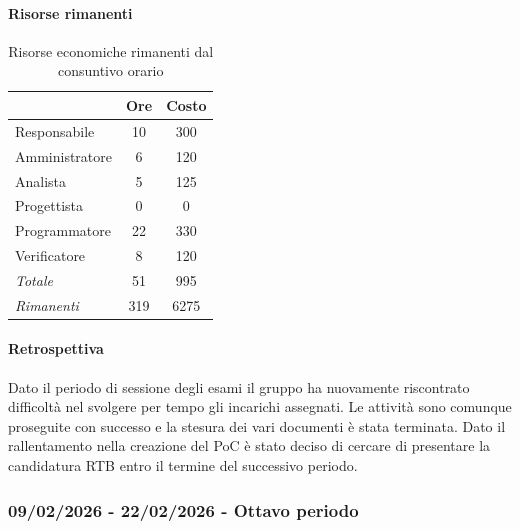 \documentclass[a4paper,12pt]{article}
\begin{document}
            \paragraph{Risorse rimanenti}
                \begin{table}[H]
                \centering
                \caption{Risorse economiche rimanenti dal consuntivo orario}
                \begin{tabular}{|l|c|c|}
                \hline
                    \rowcolor{lightgray}{\textbf{Ruolo}} & {\textbf{Ore}} & {\textbf{Costo}}\\
                \hline
                    Responsabile & 10 & 300\\
                \hline
                    Amministratore & 6 & 120\\
                \hline
                    Analista & 5 & 125\\
                \hline
                    Progettista & 0 & 0\\
                \hline
                    Programmatore & 22 & 330\\
                \hline
                    Verificatore & 8 & 120\\
                \hline
                    \rowcolor{lightgray}\textit{Totale} & 51 & 995\\
                \hline
                    \rowcolor{lightgray}\textit{Rimanenti} & 319 & 6275\\
                \hline
                \end{tabular}
                \end{table}
                
            \paragraph{Retrospettiva}
            Dato il periodo di sessione degli esami il gruppo ha nuovamente riscontrato difficoltà nel svolgere per tempo gli incarichi assegnati. Le attività sono comunque proseguite con successo e la stesura dei vari documenti è stata terminata. Dato il rallentamento nella creazione del PoC è stato deciso di cercare di presentare la candidatura RTB entro il termine del successivo periodo.
            
        \subsubsection{09/02/2026 - 22/02/2026 - Ottavo periodo}
\end{document}
